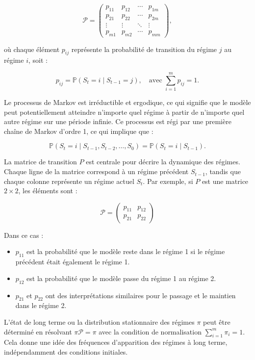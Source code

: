 \begin{sloppypar}
\begin{equation}
    \mathcal{P} = 
    \begin{pmatrix}
        p_{11} & p_{12} & \cdots & p_{1m} \\
        p_{21} & p_{22} & \cdots & p_{2m} \\
        \vdots & \vdots & \ddots & \vdots \\
        p_{m1} & p_{m2} & \cdots & p_{mm}
    \end{pmatrix},
\end{equation}

où chaque élément \( p_{ij} \) représente la probabilité de transition du régime \( j \) au régime \( i \), soit :

\[
p_{ij} = \mathbb{P}(S_t = i \mid S_{t-1} = j), \quad \text{avec } \sum_{i=1}^m p_{ij} = 1.
\]

Le processus de Markov est irréductible et ergodique, ce qui signifie que le modèle peut potentiellement atteindre n'importe quel régime à partir de n'importe quel autre régime sur une période infinie. Ce processus est régi par une première chaîne de Markov d'ordre 1, ce qui implique que :

\[
\mathbb{P}(S_t = i \mid S_{t-1}, S_{t-2}, \dots, S_0) = \mathbb{P}(S_t = i \mid S_{t-1}).
\]

La matrice de transition \( P \) est centrale pour décrire la dynamique des régimes. Chaque ligne de la matrice correspond à un régime précédent \( S_{t-1} \), tandis que chaque colonne représente un régime actuel \( S_t \). Par exemple, si \( P \) est une matrice \( 2 \times 2 \), les éléments sont :

\[
\mathcal{P} = \begin{pmatrix} 
p_{11} & p_{12} \\
p_{21} & p_{22} 
\end{pmatrix}
\]

Dans ce cas :
\begin{itemize}
    \item \( p_{11} \) est la probabilité que le modèle reste dans le régime 1 si le régime précédent était également le régime 1.
    \item \( p_{12} \) est la probabilité que le modèle passe du régime 1 au régime 2.
    \item \( p_{21} \) et \( p_{22} \) ont des interprétations similaires pour le passage et le maintien dans le régime 2.
\end{itemize}

L'état de long terme ou la distribution stationnaire des régimes \( \pi \) peut être déterminé en résolvant \( \pi \mathcal{P} = \pi \) avec la condition de normalisation \( \sum_{i=1}^m \pi_i = 1 \). Cela donne une idée des fréquences d'apparition des régimes à long terme, indépendamment des conditions initiales.


\end{sloppypar}
